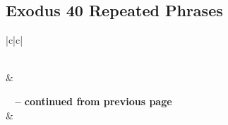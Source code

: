 \subsection{Exodus 40 Repeated Phrases}


\normalsize
 
\begin{center}
\begin{longtable}{|c|c|}
\caption[Exodus 40 Repeated Phrases]{Exodus 40 Repeated Phrases}\label{table:Repeated Phrases Exodus 40} \\
\hline {} &  \\ \hline 
\endfirsthead
 
{{\bfseries \tablename\ \thetable{} -- continued from previous page}} \\  
\hline {} &  \\ \hline 
\endhead
 

\end{longtable}
\end{center}
